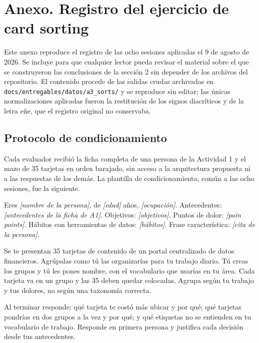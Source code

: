 \section{Anexo. Registro del ejercicio de card sorting}

Este anexo reproduce el registro de las ocho sesiones aplicadas el 9 de agosto de 2026. Se incluye para que cualquier lector pueda revisar el material sobre el que se construyeron las conclusiones de la sección 2 sin depender de los archivos del repositorio. El contenido procede de las salidas crudas archivadas en \texttt{docs/entregables/datos/a3\_sorts/} y se reproduce sin editar; las únicas normalizaciones aplicadas fueron la restitución de los signos diacríticos y de la letra eñe, que el registro original no conservaba.

\subsection{Protocolo de condicionamiento}

Cada evaluador recibió la ficha completa de una persona de la Actividad 1 y el mazo de 35 tarjetas en orden barajado, sin acceso a la arquitectura propuesta ni a las respuestas de los demás. La plantilla de condicionamiento, común a las ocho sesiones, fue la siguiente.

\begin{uxnota}
Eres \textit{[nombre de la persona]}, de \textit{[edad]} años, \textit{[ocupación]}. Antecedentes: \textit{[antecedentes de la ficha de A1]}. Objetivos: \textit{[objetivos]}. Puntos de dolor: \textit{[pain points]}. Hábitos con herramientas de datos: \textit{[hábitos]}. Frase característica: \textit{[cita de la persona]}.

Se te presentan 35 tarjetas de contenido de un portal centralizado de datos financieros. Agrúpalas como tú las organizarías para tu trabajo diario. Tú creas los grupos y tú les pones nombre, con el vocabulario que usarías en tu área. Cada tarjeta va en un grupo y las 35 deben quedar colocadas. Agrupa según tu trabajo y tus dolores, no según una taxonomía correcta.

Al terminar responde: qué tarjeta te costó más ubicar y por qué; qué tarjetas pondrías en dos grupos a la vez y por qué; y qué etiquetas no se entienden en tu vocabulario de trabajo. Responde en primera persona y justifica cada decisión desde tus antecedentes.
\end{uxnota}

